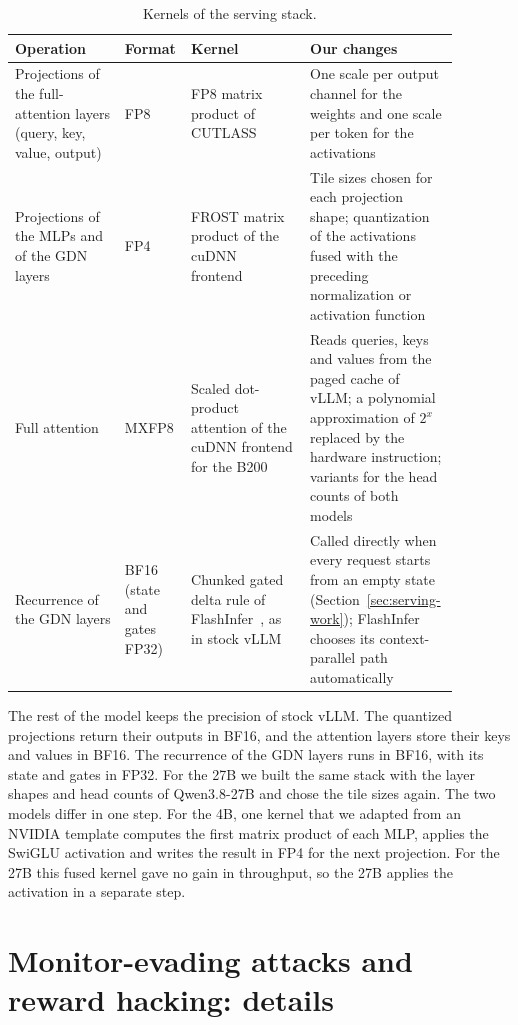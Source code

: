 \begin{table}[h]
\caption{Kernels of the serving stack.}
\label{tab:kernels}
\centering
\small
\begin{tabular}{@{}p{0.24\linewidth}p{0.09\linewidth}p{0.26\linewidth}p{0.29\linewidth}@{}}
\toprule
Operation & Format & Kernel & Our changes \\
\midrule
Projections of the full-attention layers (query, key, value, output) & FP8 & FP8 matrix product of CUTLASS~\citep{nvidia_cutlass} & One scale per output channel for the weights and one scale per token for the activations \\
\addlinespace
Projections of the MLPs and of the GDN layers & FP4 & FROST matrix product of the cuDNN frontend~\citep{nvidia_cudnn_frontend} & Tile sizes chosen for each projection shape; quantization of the activations fused with the preceding normalization or activation function \\
\addlinespace
Full attention & MXFP8 & Scaled dot-product attention of the cuDNN frontend for the B200 & Reads queries, keys and values from the paged cache of vLLM; a polynomial approximation of $2^x$ replaced by the hardware instruction; variants for the head counts of both models \\
\addlinespace
Recurrence of the GDN layers & BF16 (state and gates FP32) & Chunked gated delta rule of FlashInfer~\citep{ye2025flashinfer}, as in stock vLLM & Called directly when every request starts from an empty state (Section~\ref{sec:serving-work}); FlashInfer chooses its context-parallel path automatically \\
\bottomrule
\end{tabular}
\end{table}

The rest of the model keeps the precision of stock vLLM.
The quantized projections return their outputs in BF16, and the attention layers store their keys and values in BF16.
The recurrence of the GDN layers runs in BF16, with its state and gates in FP32.
For the 27B we built the same stack with the layer shapes and head counts of Qwen3.8-27B and chose the tile sizes again.
The two models differ in one step.
For the 4B, one kernel that we adapted from an NVIDIA template computes the first matrix product of each MLP, applies the SwiGLU activation and writes the result in FP4 for the next projection.
For the 27B this fused kernel gave no gain in throughput, so the 27B applies the activation in a separate step.

\section{Monitor-evading attacks and reward hacking: details}
\label{app:held-out}

